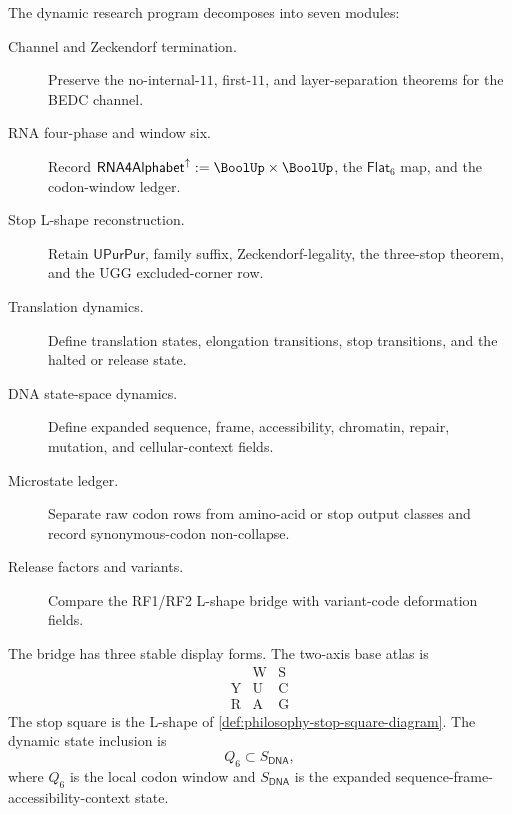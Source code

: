 \begin{definition}
\label{def:philosophy-dynamic-bridge-modules}
The dynamic research program decomposes into seven modules:
\begin{description}
  \item[Channel and Zeckendorf termination.]
  Preserve the no-internal-$11$, first-$11$, and layer-separation
  theorems for the BEDC channel.

  \item[RNA four-phase and window six.]
  Record $\mathsf{RNA4Alphabet}^{\uparrow}:=\BoolUp\times\BoolUp$,
  the $\mathsf{Flat}_{6}$ map, and the codon-window ledger.

  \item[Stop L-shape reconstruction.]
  Retain $\mathsf{UPurPur}$, family suffix, Zeckendorf-legality, the
  three-stop theorem, and the $\mathrm{UGG}$ excluded-corner row.

  \item[Translation dynamics.]
  Define translation states, elongation transitions, stop transitions,
  and the halted or release state.

  \item[DNA state-space dynamics.]
  Define expanded sequence, frame, accessibility, chromatin, repair,
  mutation, and cellular-context fields.

  \item[Microstate ledger.]
  Separate raw codon rows from amino-acid or stop output classes and
  record synonymous-codon non-collapse.

  \item[Release factors and variants.]
  Compare the RF1/RF2 L-shape bridge with variant-code deformation
  fields.
\end{description}
\end{definition}

\begin{definition}
\label{def:philosophy-dynamic-bridge-figures}
The bridge has three stable display forms. The two-axis base atlas is
$$
\begin{array}{c|cc}
   & \mathrm{W} & \mathrm{S}\\
\hline
  \mathrm{Y} & \mathrm{U} & \mathrm{C}\\
  \mathrm{R} & \mathrm{A} & \mathrm{G}
\end{array}
$$
The stop square is the L-shape of
\autoref{def:philosophy-stop-square-diagram}. The dynamic state
inclusion is
$$
  Q_{6}
  \subset
  S_{\mathsf{DNA}},
$$
where $Q_{6}$ is the local codon window and
$S_{\mathsf{DNA}}$ is the expanded sequence-frame-accessibility-context
state.
\end{definition}

